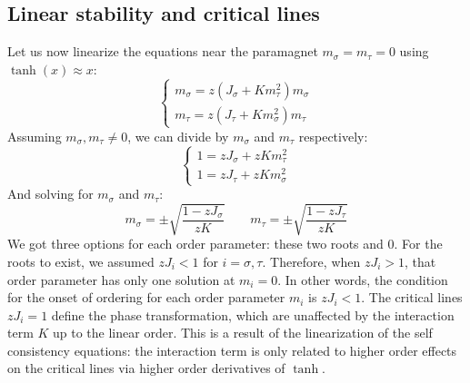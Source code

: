 \documentclass{article}
\begin{document}
\subsection{Linear stability and critical lines}
Let us now linearize the equations near the paramagnet $m_\sigma = m_\tau = 0$ using $\tanh(x) \approx x$:
\begin{equation}
\begin{cases}
    m_\sigma = z(J_\sigma + K m_\tau^2)m_\sigma
    \\
    m_\tau = z(J_\tau + K m_\sigma^2)m_\tau
\end{cases}
\end{equation}
Assuming $m_\sigma, m_\tau \ne 0$, we can divide by $m_\sigma$ and $m_\tau$ respectively:
\begin{equation}
\begin{cases}
    1 = zJ_\sigma + zK m_\tau^2
    \\
    1 = zJ_\tau + zK m_\sigma^2
\end{cases}
\end{equation}
And solving for $m_\sigma$ and $m_\tau$:
\begin{equation}
    m_\sigma = \pm \sqrt{\frac{1 - zJ_\sigma}{zK}}
    \qquad
    m_\tau = \pm \sqrt{\frac{1 - zJ_\tau}{zK}}
\end{equation}
We got three options for each order parameter: these two roots and 0. For the roots to exist, we assumed $zJ_i < 1$ for $i = \sigma, \tau$. Therefore, when $zJ_i > 1$, that order parameter has only one solution at $m_i = 0$. In other words, the condition for the onset of ordering for each order parameter $m_i$ is $zJ_i < 1$.
\newline
The critical lines $zJ_i = 1$ define the phase transformation, which are unaffected by the interaction term $K$ up to the linear order. This is a result of the linearization of the self consistency equations: the interaction term is only related to higher order effects on the critical lines via higher order derivatives of $\tanh$.
\end{document}
